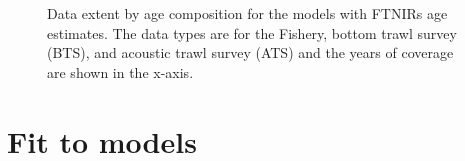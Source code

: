 \documentclass[
  letterpaper,
  DIV=11,
  numbers=noendperiod]{scrreprt}
\begin{document}
\begin{figure}


\caption{\label{fig-dataExtent}Data extent by age composition for the
models with FTNIRs age estimates. The data types are for the Fishery,
bottom trawl survey (BTS), and acoustic trawl survey (ATS) and the years
of coverage are shown in the x-axis.}

\end{figure}%

\section{Fit to models}\label{fit-to-models}
\end{document}
